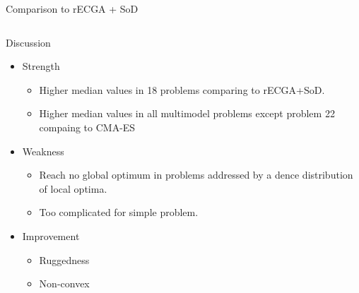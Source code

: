 \begin{frame}{Comparison to rECGA + SoD}
\begin{columns}
\end{columns}

\end{frame}
\begin{frame}{Discussion}
 
  \begin{itemize}
    \item Strength
      \begin{itemize}
        \item Higher median values in 18 problems comparing to rECGA+SoD.
        \item Higher median values in all multimodel problems except
          problem 22 compaing to CMA-ES
      \end{itemize}
      \vspace*{14pt}
    \item Weakness
      \begin{itemize}
        \item Reach no global optimum in problems addressed by a dence
          distribution of local optima.
        \item Too complicated for simple problem.
      \end{itemize}
      \vspace*{14pt}
    \item Improvement
      \begin{itemize}
        \item Ruggedness
        \item Non-convex
      \end{itemize}

  \end{itemize}

\end{frame}
